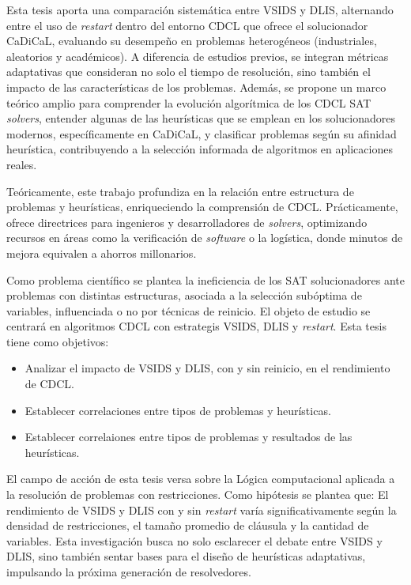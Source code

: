 Esta tesis aporta una comparación sistemática entre VSIDS y DLIS, alternando entre el uso de \textit{restart} dentro del entorno CDCL que ofrece el solucionador CaDiCaL, evaluando su desempeño en problemas heterogéneos (industriales, aleatorios y académicos). A diferencia de estudios previos, se integran métricas adaptativas que consideran no solo el tiempo de resolución, sino también el impacto de las caracter\'isticas de los problemas. Además, se propone un marco teórico amplio para comprender la evoluci\'on algor\'itmica de los CDCL SAT \textit{solvers}, entender algunas de las heur\'isticas que se emplean en los solucionadores modernos, espec\'ificamente en CaDiCaL, y clasificar problemas según su afinidad heurística, contribuyendo a la selección informada de algoritmos en aplicaciones reales.

Teóricamente, este trabajo profundiza en la relación entre estructura de problemas y heurísticas, enriqueciendo la comprensión de CDCL. Prácticamente, ofrece directrices para ingenieros y desarrolladores de \textit{solvers}, optimizando recursos en áreas como la verificación de \textit{software} o la logística, donde minutos de mejora equivalen a ahorros millonarios.

Como problema científico se plantea la ineficiencia de los SAT solucionadores ante problemas con distintas estructuras, asociada a la selección subóptima de variables, influenciada o no por t\'ecnicas de reinicio. El objeto de estudio se centrar\'a en algoritmos CDCL con estrategis VSIDS, DLIS y \textit{restart}. Esta tesis tiene como objetivos:
\begin{itemize}
    \item Analizar el impacto de VSIDS y DLIS, con y sin reinicio, en el rendimiento de CDCL.
    \item Establecer correlaciones entre tipos de problemas y heurísticas.
    \item Establecer correlaiones entre tipos de problemas y resultados de las heur\'isticas.
\end{itemize}
El campo de acci\'on de esta tesis versa sobre la Lógica computacional aplicada a la resolución de problemas con restricciones.
Como hipótesis se plantea que: El rendimiento de VSIDS y DLIS con y sin \textit{restart} varía significativamente según la densidad de restricciones, el tama\~no promedio de cl\'ausula y la cantidad de variables.
Esta investigación busca no solo esclarecer el debate entre VSIDS y DLIS, sino también sentar bases para el diseño de heurísticas adaptativas, impulsando la próxima generación de resolvedores.

